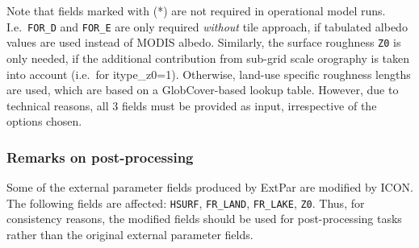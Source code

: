 Note that fields marked with (*) are not required in operational model runs. I.e.\ \texttt{FOR\_D} and \texttt{FOR\_E} are only required \emph{without} 
tile approach, if tabulated albedo values are used instead of MODIS albedo. Similarly, the surface roughness \texttt{Z0} is only needed, 
if the additional contribution from sub-grid scale orography is taken into account (i.e.\ for itype\_z0=1). Otherwise, land-use specific 
roughness lengths are used, which are based on a GlobCover-based lookup table. However, due to technical reasons, all $3$ fields must be provided as 
input, irrespective of the options chosen.

\subsubsection*{Remarks on post-processing}
Some of the external parameter fields produced by ExtPar are modified by ICON. The following fields are affected: \texttt{HSURF}, 
\texttt{FR\_LAND}, \texttt{FR\_LAKE}, \texttt{Z0}. Thus, for consistency reasons, the modified fields should be used for post-processing tasks 
rather than the original external parameter fields.
